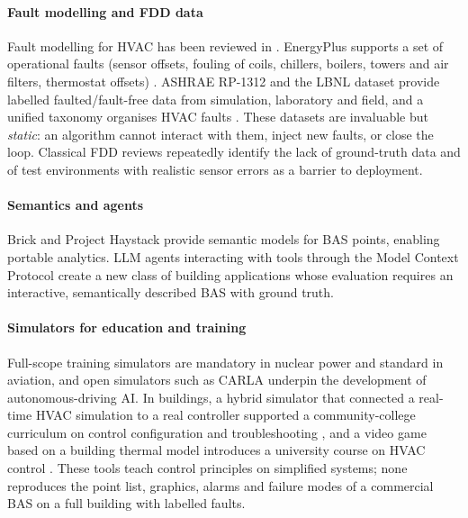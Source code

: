 \documentclass[preprint,12pt,authoryear=false]{elsarticle}
\begin{document}
\paragraph{Fault modelling and FDD data} Fault modelling for HVAC has been reviewed in \cite{li2018faultreview}.
EnergyPlus supports a set of operational faults (sensor offsets, fouling of coils, chillers, boilers, towers and air
filters, thermostat offsets) \cite{zhang2017faults}. ASHRAE RP-1312 \cite{wen2012rp1312} and the LBNL dataset
\cite{granderson2023dataset} provide labelled faulted/fault-free data from simulation, laboratory and field, and a
unified taxonomy organises HVAC faults \cite{chen2021taxonomy}. These datasets are invaluable but \emph{static}: an
algorithm cannot interact with them, inject new faults, or close the loop. Classical FDD reviews
\cite{katipamula2005review1,kim2018fddreview} repeatedly identify the lack of ground-truth data and of test
environments with realistic sensor errors as a barrier to deployment.

\paragraph{Semantics and agents} Brick \cite{balaji2016brick} and Project Haystack \cite{haystack} provide semantic
models for BAS points, enabling portable analytics. LLM agents interacting with tools through the Model Context
Protocol \cite{mcp2024} create a new class of building applications whose evaluation requires an interactive,
semantically described BAS with ground truth.

\paragraph{Simulators for education and training} Full-scope training simulators are mandatory in nuclear power
\cite{ans35} and standard in aviation, and open simulators such as CARLA \cite{dosovitskiy2017carla} underpin the
development of autonomous-driving AI. In buildings, a hybrid simulator that connected a real-time HVAC simulation to a
real controller supported a community-college curriculum on control configuration and troubleshooting
\cite{xu2004training}, and a video game based on a building thermal model introduces a university course on HVAC
control \cite{johra2020geenie}. These tools teach control principles on simplified systems; none reproduces the point
list, graphics, alarms and failure modes of a commercial BAS on a full building with labelled faults.
\end{document}
